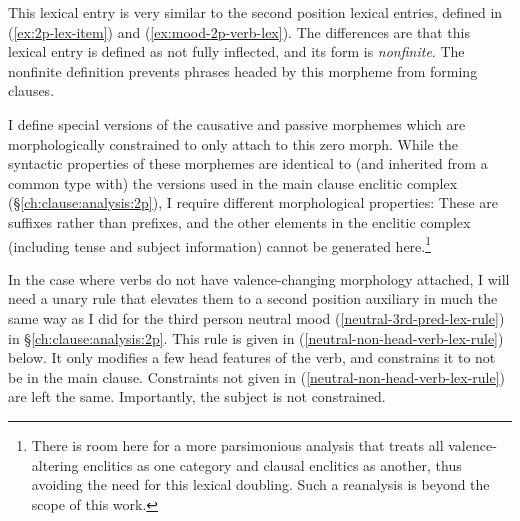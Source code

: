 \ex \label{ex:svc-zero-morpheme}
\xe

This lexical entry is very similar to the second position lexical entries, defined in (\ref{ex:2p-lex-item}) and (\ref{ex:mood-2p-verb-lex}). The differences are that this lexical entry is defined as not fully inflected, and its form is \textit{nonfinite}. The nonfinite definition prevents phrases headed by this morpheme from forming clauses.

I define special versions of the causative and passive morphemes which are morphologically constrained to only attach to this zero morph. While the syntactic properties of these morphemes are identical to (and inherited from a common type with) the versions used in the main clause enclitic complex (\S\ref{ch:clause:analysis:2p}), I require different morphological properties: These are suffixes rather than prefixes, and the other elements in the enclitic complex (including tense and subject information) cannot be generated here.\footnote{There is room here for a more parsimonious analysis that treats all valence-altering enclitics as one category and clausal enclitics as another, thus avoiding the need for this lexical doubling. Such a reanalysis is beyond the scope of this work.}

In the case where verbs do not have valence-changing morphology attached, I will need a unary rule that elevates them to a second position auxiliary in much the same way as I did for the third person neutral mood (\ref{neutral-3rd-pred-lex-rule}) in \S\ref{ch:clause:analysis:2p}. This rule is given in (\ref{neutral-non-head-verb-lex-rule}) below. It only modifies a few head features of the verb, and constrains it to not be in the main clause. Constraints not given in (\ref{neutral-non-head-verb-lex-rule}) are left the same. Importantly, the subject is not constrained.

